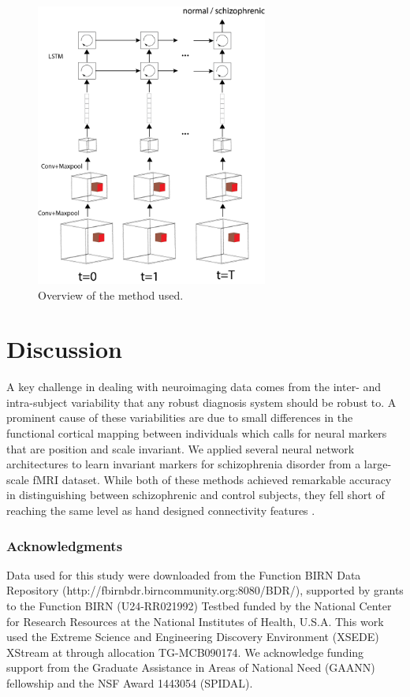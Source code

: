 \documentclass{article}
\begin{document}
\begin{figure}[t]
\begin{center}
\includegraphics[width=3in]{figures/overview.png}
\end{center}
\caption{Overview of the method used.}
\label{fig1}
\end{figure}

\section{Discussion}
A key challenge in dealing with neuroimaging data comes from the inter- and intra-subject variability that any robust diagnosis system should be robust to. A prominent cause of these variabilities are due to small differences in the functional cortical mapping between individuals which calls for neural markers that are position and scale invariant. We applied several neural network architectures to learn invariant markers for schizophrenia disorder from a large-scale fMRI dataset. While both of these methods achieved remarkable accuracy in distinguishing between schizophrenic and control subjects, they fell short of reaching the same level as hand designed connectivity features \citep{Gheiratmand2017}.


\subsubsection*{Acknowledgments}

Data used for this study were downloaded from the Function BIRN Data Repository (http://fbirnbdr.birncommunity.org:8080/BDR/), supported by grants to the Function BIRN (U24-RR021992) Testbed funded by the National Center for Research Resources at the National Institutes of Health, U.S.A. This work used the Extreme Science and Engineering Discovery Environment (XSEDE) XStream at through allocation TG-MCB090174. We acknowledge funding support from the Graduate Assistance in Areas of National Need (GAANN) fellowship and the NSF Award 1443054 (SPIDAL). 



\end{document}
